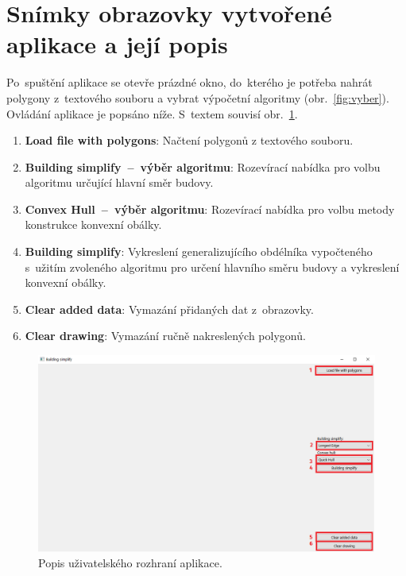 \documentclass[a4paper, 12pt, oneside, titlepage]{article} %
\begin{document}
\section{Snímky obrazovky vytvořené aplikace a její popis}

Po~spuštění aplikace se otevře prázdné okno, do~kterého je potřeba nahrát polygony z~textového souboru a vybrat výpočetní algoritmy (obr.~\ref{fig:vyber}). Ovládání aplikace je popsáno níže. S~textem souvisí obr.~\ref{fig:popis_ui}.

\begin{enumerate}
\item \textbf{Load file with polygons}: Načtení polygonů z textového souboru. 
\item \textbf{Building simplify~--~výběr algoritmu}: Rozevírací nabídka pro volbu algoritmu určující hlavní směr budovy. 
\item \textbf{Convex Hull~--~výběr algoritmu}: Rozevírací nabídka pro volbu metody konstrukce konvexní obálky.
\item \textbf{Building simplify}: Vykreslení generalizujícího obdélníka vypočteného s~užitím zvoleného algoritmu pro určení hlavního směru budovy a vykreslení konvexní obálky.
\item \textbf{Clear added data}: Vymazání přidaných dat z~obrazovky.
\item \textbf{Clear drawing}: Vymazání ručně nakreslených polygonů.
\end{enumerate}


\begin{figure}[!htb]
	\centering
	\includegraphics[scale=0.5]{obrazky/popis_ui.png} 
	\caption{Popis uživatelského rozhraní aplikace.
	}
	\label{fig:popis_ui}
\end{figure} 
\FloatBarrier
\end{document}
